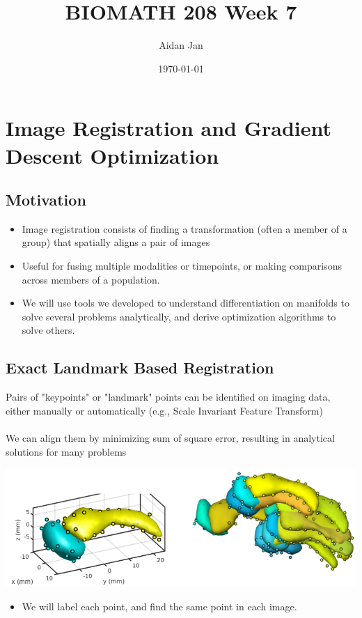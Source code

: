 \documentclass[10pt]{article}
\title{BIOMATH 208 Week 7}
\author{Aidan Jan}
\date{\today}
\begin{document}
\maketitle

\section*{Image Registration and Gradient Descent Optimization}


\subsection*{Motivation}
\begin{itemize}
    \item Image registration consists of finding a transformation (often a member of a group) that spatially aligns a pair of images
    \item Useful for fusing multiple modalities or timepoints, or making comparisons across members of a population.
    \item We will use tools we developed to understand differentiation on manifolds to solve several problems analytically, and derive optimization algorithms to solve others.
\end{itemize}

\subsection*{Exact Landmark Based Registration}
Pairs of "keypoints" or "landmark" points can be identified on imaging data, either manually or automatically (e.g., Scale Invariant Feature Transform)\\\\
We can align them by minimizing sum of square error, resulting in analytical solutions for many problems
\begin{center}
    \includegraphics*[width=\textwidth]{W7_1.png}
\end{center}
\begin{itemize}
    \item We will label each point, and find the same point in each image.
\end{itemize}
\end{document}
